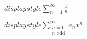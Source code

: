 \documentclass[10pt]{article}
\begin{document}
    \(displaystyle \sum_{n=1}^{\infty} \frac{1}{n} \)

    \(displaystyle \sum_{ \substack{n=0 \\ n \text{ odd}} }^\infty a_{n} x^n \)
\end{document}
